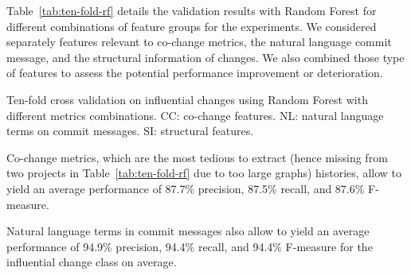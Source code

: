 
Table~\ref{tab:ten-fold-rf} details the validation results with Random Forest for different combinations 
of feature groups for the experiments.
We considered separately features relevant to co-change metrics, the natural
language commit message, and the structural information of changes. We
also combined those type of features to assess the potential performance
improvement or deterioration.

\begin{table}[h!]
    \caption{Ten-fold cross validation on influential changes using 
    Random Forest with different metrics combinations. 
    CC: co-change features. NL: natural language terms on commit messages.
    SI: structural features.}
    \label{tab:ten-fold-rf}
    
\end{table}

Co-change metrics, which are the most tedious to extract (hence missing from two projects in Table~\ref{tab:ten-fold-rf} due to too large graphs)
histories, allow to yield an average performance of 87.7\% precision, 
87.5\% recall, and 87.6\% F-measure.


Natural language terms in commit messages also allow to yield an average
performance of 94.9\% precision, 94.4\% recall, and 94.4\% F-measure
for the influential change class on average.


